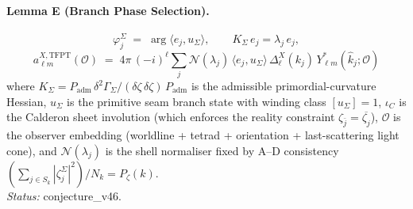 \documentclass[11pt,a4paper]{article}
\begin{document}
\paragraph{Lemma E (Branch Phase Selection).}
\begin{equation}
\boxed{\;
\varphi_j^\Sigma \;=\; \arg\langle e_j,u_\Sigma\rangle, \qquad
K_\Sigma\,e_j = \lambda_j\,e_j ,
\;}
\label{eq:lemmaE_phase}
\end{equation}
\begin{equation}
\boxed{\;
a_{\ell m}^{X,\mathrm{TFPT}}(\mathcal O) \;=\;
4\pi\,(-i)^\ell\sum_j
\mathcal N(\lambda_j)\,
\langle e_j,u_\Sigma\rangle\,
\Delta_\ell^X(k_j)\,Y_{\ell m}^{*}(\hat k_j;\mathcal O)
\;}
\label{eq:lemmaE_alm}
\end{equation}
where \(K_\Sigma = P_{\mathrm{adm}}\,\delta^2\Gamma_\Sigma/(\delta\zeta\,\delta\zeta)\,P_{\mathrm{adm}}\) is the admissible primordial-curvature Hessian, \(u_\Sigma\) is the primitive seam branch state with winding class \([u_\Sigma]=1\), \(\iota_C\) is the Calderon sheet involution (which enforces the reality constraint
\(\zeta_{\bar j}=\overline{\zeta_j}\)), \(\mathcal O\) is the observer
embedding (worldline + tetrad + orientation + last-scattering light
cone), and \(\mathcal N(\lambda_j)\) is the shell normaliser fixed by
A--D consistency
\((\sum_{j\in S_k}|\zeta_j^\Sigma|^2)/N_k = P_\zeta(k)\).\\
\emph{Status:} \textsf{conjecture\_v46}.
\end{document}
